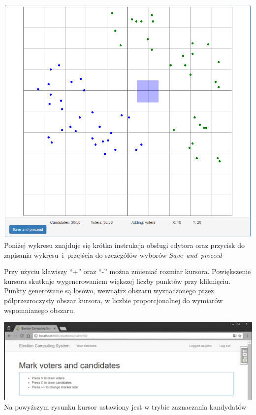 \documentclass[pdflatex,11pt]{../aghdoc_version2}
\begin{document}
\begin{center}
\includegraphics[width=1.0\textwidth]{pics/paint_2.png}
Poniżej wykresu znajduje się krótka instrukcja obsługi edytora oraz przycisk do zapisania 
\mbox{wykresu i przejścia} do szczegółów wyborów
\mbox{\textit{Save and proceed}}
\end{center}

\newpage
Przy użyciu klawiszy ``+'' oraz ``-'' można zmieniać rozmiar kursora. 
Powiększenie kursora skutkuje wygenerowaniem większej liczby punktów przy kliknięciu.
Punkty generowane są losowo, wewnątrz obszaru wyznaczonego przez półprzezroczysty obszar kursora, 
w liczbie proporcjonalnej do wymiarów wspomnianego obszaru.

\begin{center}
\includegraphics[width=1.0\textwidth]{pics/paint_1.png}
 Na powyższym rysunku 
kursor ustawiony jest w trybie zaznaczania kandydatów
\end{center}
\end{document}
